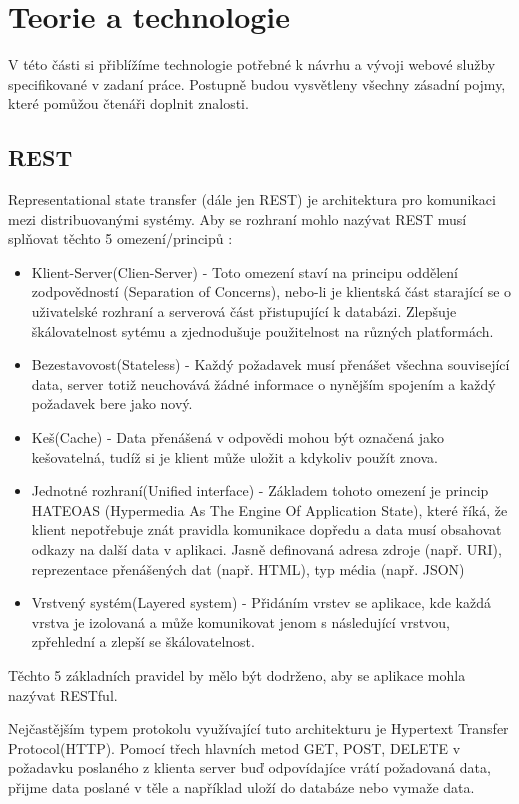    
  \chapter{Teorie a technologie}
  V této části si přiblížíme technologie potřebné k návrhu a vývoji webové služby specifikované v zadaní práce. Postupně budou vysvětleny všechny zásadní pojmy, které pomůžou čtenáři doplnit znalosti.
  
  
  \section{REST}
	Representational state transfer (dále jen REST) je architektura pro komunikaci \cite{rest} mezi distribuovanými systémy. Aby se rozhraní mohlo nazývat REST musí splňovat těchto 5 omezení/principů \cite{restThesis}: 
	\begin{itemize}
		\item Klient-Server(Clien-Server) - Toto omezení staví na principu oddělení zodpovědností (Separation of Concerns), nebo-li je klientská část starající se o uživatelské rozhraní a serverová část přistupující k databázi. Zlepšuje škálovatelnost sytému a zjednodušuje použitelnost na různých platformách.
		\item Bezestavovost(Stateless) - Každý požadavek musí přenášet všechna související data, server totiž neuchovává žádné informace o nynějším spojením a každý požadavek bere jako nový.
		\item Keš(Cache) - Data přenášená v odpovědi mohou být označená jako kešovatelná, tudíž si je klient může uložit a kdykoliv použít znova.
		\item Jednotné rozhraní(Unified interface) - Základem tohoto omezení je princip HATEOAS (Hypermedia As The Engine Of Application State), které říká, že klient nepotřebuje znát pravidla komunikace dopředu a data musí obsahovat odkazy na další data v aplikaci. Jasně definovaná adresa zdroje (např. URI), reprezentace přenášených dat (např. HTML), typ média (např. JSON)
		\item Vrstvený systém(Layered system) - Přidáním vrstev se aplikace, kde každá vrstva je izolovaná a může komunikovat jenom s následující vrstvou, zpřehlední a zlepší se škálovatelnost.
	\end{itemize}
	Těchto 5 základních pravidel by mělo být dodrženo, aby se aplikace mohla nazývat RESTful.  
	
	Nejčastějším typem protokolu využívající tuto architekturu je Hypertext Transfer Protocol(HTTP). Pomocí třech hlavních metod GET, POST, DELETE v požadavku poslaného z klienta server buď odpovídajíce vrátí požadovaná data, přijme data poslané v těle a například uloží do databáze nebo vymaže data. 
  
